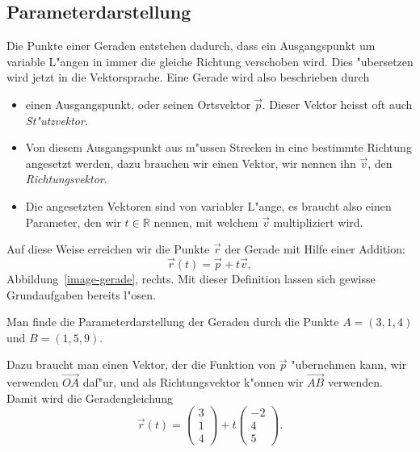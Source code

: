 \subsection{Parameterdarstellung}
Die Punkte einer Geraden entstehen dadurch, dass ein Ausgangspunkt um
variable L"angen in immer die gleiche Richtung verschoben wird.
Dies "ubersetzen wird jetzt in die Vektorsprache.
Eine Gerade wird also beschrieben durch
\begin{itemize}
\item einen Ausgangspunkt, oder seinen Ortsvektor $\vec p$.
Dieser Vektor heisst oft auch {\em St"utzvektor}.
\item Von diesem Ausgangspunkt aus m"ussen Strecken in eine bestimmte
Richtung angesetzt werden, dazu brauchen wir einen Vektor, wir nennen ihn
$\vec v$, den {\em Richtungsvektor}.
\item Die angesetzten Vektoren sind von variabler L"ange, es braucht also
einen Parameter, den wir $t\in \mathbb R$ nennen, mit welchem $\vec v$
multipliziert wird.
\end{itemize}
Auf diese Weise erreichen wir die Punkte $\vec r$ der Gerade mit Hilfe
einer Addition:
\[
\vec r(t)=\vec p+t\vec v,
\]
Abbildung~\ref{image-gerade}, rechts.
Mit dieser Definition lassen sich gewisse Grundaufgaben bereits l"osen.

\begin{beispiel}
Man finde die Parameterdarstellung der Geraden durch die Punkte
$A=(3,1,4)$ und $B=(1,5,9)$.

\smallskip

{\parindent 0pt
Dazu} braucht man einen Vektor, der die Funktion von $\vec p$ "ubernehmen
kann, wir verwenden $\overrightarrow{OA}$ daf"ur, und als
Richtungsvektor k"onnen wir $\overrightarrow{AB}$ verwenden.
Damit wird die Geradengleichung
\begin{equation}
\vec r(t) =
\begin{pmatrix}3\\1\\4 \end{pmatrix}
+t
\begin{pmatrix}-2\\4\\5\end{pmatrix}.
\label{pigerade}
\end{equation}
\end{beispiel}

